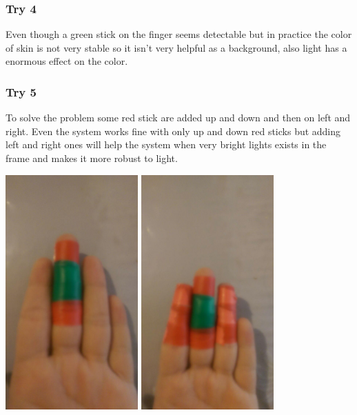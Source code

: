 \documentclass{report}
\begin{document}
\subsubsection{Try 4}
Even though a green stick on the finger seems detectable but in practice the color of skin is not very stable so it isn't very helpful as a background, also light has a enormous effect on the color.
\subsubsection{Try 5}
To solve the problem some red stick are added up and down and then on left and right. Even the system works fine with only  up and down red sticks but adding left and right ones will help the system when very bright lights exists in the frame and makes it more robust to light.
\begin{center}
	\includegraphics[width=2in]{Object4.jpg}  
	\includegraphics[width=2in]{Object5.jpg} 
\end{center}
\end{document}
